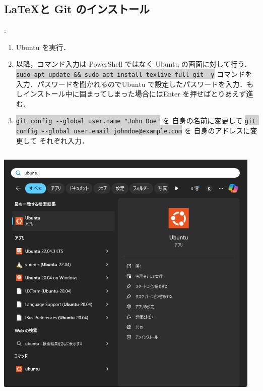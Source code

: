 \documentclass[aspectratio=169,dvipdfmx,cjk]{beamer}
\newcommand{\cmdline}[1]{
    \colorbox{lightgray}{\lstinline[style=command]{#1}}
}
\newcommand{\blue}[1]{ {\color{blue} #1} }
\begin{document}
\subsection{\LaTeX と Git のインストール}
\begin{frame}{\insertsection \thesubsection: \insertsubsection}
  \begin{enumerate}
    \item Ubuntu を実行．
    \item 以降，コマンド入力は PowerShell ではなく Ubuntu の画面に対して行う．\\ \cmdline{sudo apt update && sudo apt install texlive-full git -y} コマンドを入力．パスワードを聞かれるのでUbuntu で設定したパスワードを入力．もしインストール中に固まってしまった場合にはEnter を押せばとりあえず進む\cite{LaTeXBug}．
    \item \cmdline{git config --global user.name "John Doe"} を\blue{自身の名前に変更して} \cmdline{git config --global user.email johndoe@example.com} を\blue{自身のアドレスに変更して}それぞれ入力\cite{GitBook}．
  \end{enumerate}
  \begin{columns}
    \begin{column}{0.2\textwidth}
        \includegraphics[width=1.0\linewidth]{fig/start-ubuntu.png}
    \end{column}
    \begin{column}{0.3\textwidth}

\end{column}
\end{columns}
\end{frame}
\end{document}
